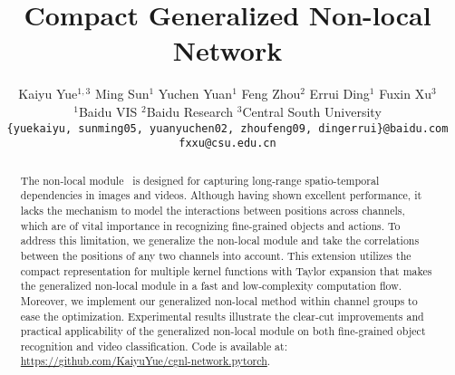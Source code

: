\documentclass{article}
\title{Compact Generalized Non-local Network}
\author{
  \vspace{1mm} %
  Kaiyu Yue$^{1,3}$\quad
  Ming Sun$^{1}$\quad
  Yuchen Yuan$^{1}$\quad
  Feng Zhou$^{2}$\quad
  Errui Ding$^{1}$\quad
  Fuxin Xu$^{3}$\quad\\
  \vspace{1mm} %
  $^{1}$Baidu VIS\quad
  $^{2}$Baidu Research\quad
  $^{3}$Central South University\\
  \texttt{\{yuekaiyu, sunming05, yuanyuchen02, zhoufeng09, dingerrui\}@baidu.com}\\
  \texttt{fxxu@csu.edu.cn}
}
\begin{document}

\maketitle
%
%
\begin{abstract}
The non-local module~\cite{non-local} is designed for capturing long-range spatio-temporal dependencies in images and videos.
Although having shown excellent performance, it lacks the mechanism to model the interactions between positions across channels, which are of vital importance in recognizing fine-grained objects and actions.
To address this limitation, we generalize the non-local module and take the correlations between the positions of any two channels into account.
This extension utilizes the compact representation for multiple kernel functions with Taylor expansion that makes the generalized non-local module in a fast and low-complexity computation flow.
Moreover, we implement our generalized non-local method within channel groups to ease the optimization.
Experimental results illustrate the clear-cut improvements and practical applicability of the generalized non-local module on both fine-grained object recognition and video classification.
Code is available at: \url{https://github.com/KaiyuYue/cgnl-network.pytorch}.
\end{abstract}
%
%
\end{document}
